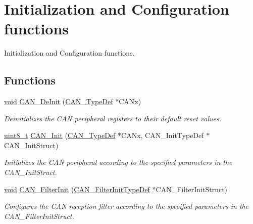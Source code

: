 \hypertarget{group___c_a_n___group1}{\section{Initialization and Configuration functions}
\label{group___c_a_n___group1}
}


Initialization and Configuration functions.  


\subsection*{Functions}
\begin{DoxyCompactItemize}
\item 
\hyperlink{group___n_a_m_e_ga18028b8badbf1ea7e704ccac3c488e82}{void} \hyperlink{group___c_a_n___group1_ga002b74cd69574a14b17ad445090245cd}{C\-A\-N\-\_\-\-De\-Init} (\hyperlink{struct_c_a_n___type_def}{C\-A\-N\-\_\-\-Type\-Def} $\ast$C\-A\-Nx)
\begin{DoxyCompactList}\small\item\em Deinitializes the C\-A\-N peripheral registers to their default reset values. \end{DoxyCompactList}\item 
\hyperlink{stdint_8h_aba7bc1797add20fe3efdf37ced1182c5}{uint8\-\_\-t} \hyperlink{group___c_a_n___group1_ga9023c35a9ab931ad4513fc5d19b4bd6c}{C\-A\-N\-\_\-\-Init} (\hyperlink{struct_c_a_n___type_def}{C\-A\-N\-\_\-\-Type\-Def} $\ast$C\-A\-Nx, C\-A\-N\-\_\-\-Init\-Type\-Def $\ast$C\-A\-N\-\_\-\-Init\-Struct)
\begin{DoxyCompactList}\small\item\em Initializes the C\-A\-N peripheral according to the specified parameters in the C\-A\-N\-\_\-\-Init\-Struct. \end{DoxyCompactList}\item 
\hyperlink{group___n_a_m_e_ga18028b8badbf1ea7e704ccac3c488e82}{void} \hyperlink{group___c_a_n___group1_ga39476830280340363c51041be6b12647}{C\-A\-N\-\_\-\-Filter\-Init} (\hyperlink{struct_c_a_n___filter_init_type_def}{C\-A\-N\-\_\-\-Filter\-Init\-Type\-Def} $\ast$C\-A\-N\-\_\-\-Filter\-Init\-Struct)
\begin{DoxyCompactList}\small\item\em Configures the C\-A\-N reception filter according to the specified parameters in the C\-A\-N\-\_\-\-Filter\-Init\-Struct. \end{DoxyCompactList}\item 

\end{DoxyCompactItemize}
